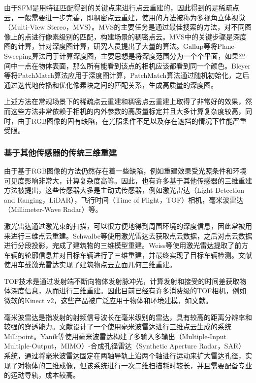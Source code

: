 由于SFM是用特征匹配得到的关键点来进行点云重建的，因此得到的是稀疏点云，一般需要进一步完善，即稠密点云重建，使用的方法被称为多视角立体视觉（Multi-View Stereo，MVS）。MVS的主要任务是通过最佳搜索的方法，对不同图像上的点进行像素级别的匹配，构建场景的稠密点云。MVS中的关键步骤是深度图的计算，针对深度图计算，研究人员提出了大量的算法。Gallup等\cite{gallup2007real}将Plane-Sweeping算法用于计算深度图，主要思想是将深度范围分为一个个平面，如果空间中一点在物体表面，那么所有能看到该点的相机应该都看到同一个颜色。Bleyer等\cite{bleyer2011patchmatch}将PatchMatch算法应用于深度图计算，PatchMatch算法通过随机初始化，之后通过迭代地传播和优化像素块之间的匹配关系，生成高质量的深度图。

上述方法在常规场景下的稀疏点云重建和稠密点云重建上取得了非常好的效果，然而这些方法非常依赖于相机的内外参数的高质量标定并且大多计算复杂度较高，同时，由于RGB图像的固有缺陷，在光照条件不足以及存在遮挡的情况下性能严重受限。

\subsubsection{基于其他传感器的传统三维重建}
由于基于RGB图像的方法仍然存在着一些缺陷，例如重建效果受光照条件和环境可见度影响非常大，计算复杂度高等。因此，也有许多基于其他传感器的三维重建方法被提出，这些传感器大多是主动式传感器，例如激光雷达（Light Detection and Ranging，LiDAR），飞行时间（Time of Flight，TOF）相机，毫米波雷达（Millimeter-Wave Radar）等。

激光雷达通过激光束的扫描，可以很方便地得到周围环境的深度信息，因此常被用来进行三维点云重建。Schwalbe等\cite{schwalbe20053d}使用激光雷达去获取点云数据，之后对点云数据进行分段投影，完成了建筑物的三维模型重建。Weiss等\cite{weiss2007robust}使用激光雷达提取了前方车辆的轮廓信息并对目标车辆进行了三维重建，并最终实现了目标车辆检测。文献\parencite{1013151916.nh}使用车载激光雷达实现了建筑物点云立面几何三维重建。

TOF技术是通过发射端不断向物体发射脉冲光，计算发射和接受的时间差获取物体深度信息，从而进行三维重建。因此目前已经有许多消费级的TOF相机，例如微软的Kinect v2，这些产品被广泛应用于物体和环境建模，如文献\parencite{RJXB201610006}。

毫米波雷达是指发射的射频信号波长在毫米级别的雷达，具有较高的距离分辨率和较强的穿透能力。文献\parencite{qian20203d}设计了一个使用毫米波雷达进行三维点云生成的系统Millipoint。Yanik等\cite{yanik20193}使用毫米波雷达构建了多输入多输出（Multiple-Input Multiple-Output，MIMO）-合成孔径雷达（Synthetic Aperture Radar，SAR）系统，通过将毫米波雷达固定在两轴导轨上沿两个轴进行运动来扩大雷达孔径，实现了对物体的三维成像，但该系统进行一次二维扫描耗时较长，并且需要配备专业的运动导轨，成本较高。

